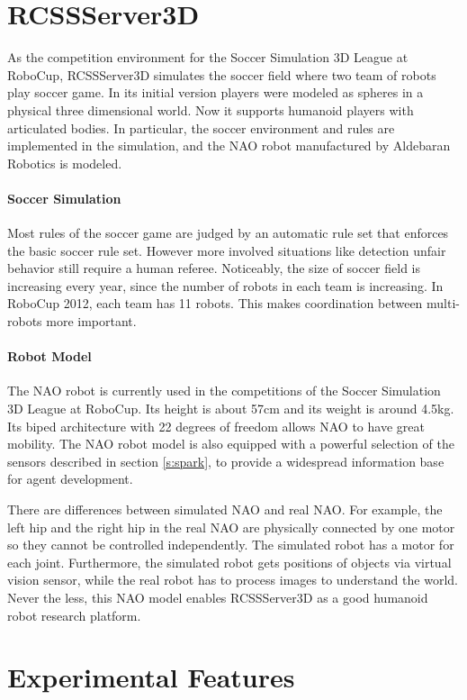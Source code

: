 \documentclass{llncs}
\begin{document}
\section{RCSSServer3D}
\label{s:rcssserver3d}

As the competition environment for the Soccer Simulation 3D League at RoboCup, 
RCSSServer3D simulates the soccer field where two team of robots play soccer game.
In its initial version players were modeled as spheres in a physical three dimensional world. Now it supports humanoid players with articulated bodies. In particular,  the soccer environment and rules are implemented in the simulation, and the NAO robot manufactured by Aldebaran Robotics is modeled.

\paragraph{Soccer Simulation}
Most rules of the soccer game are judged by an automatic rule set that enforces the basic soccer rule set.
However more involved situations like detection unfair behavior still require a human referee.
Noticeably, the size of soccer field is increasing every year, since the number of robots in each team is increasing. In RoboCup 2012, each team has 11 robots.
This makes coordination between multi-robots more important.

\paragraph{Robot Model}
The NAO robot is currently used in the competitions of the Soccer Simulation 3D League at RoboCup. Its height is about 57cm and its weight is around 4.5kg.
Its biped architecture with 22 degrees of freedom allows NAO to have great mobility.
The NAO robot model is also equipped with a powerful selection of the
sensors described in section \ref{s:spark}, to provide a widespread information base for
agent development.

There are differences between simulated NAO and real NAO. For example, the left hip and the right hip in the real NAO are physically connected by one motor so they cannot be controlled independently. The simulated robot has a motor for each joint. Furthermore, the simulated robot gets positions of objects via virtual vision sensor, while the real robot has to process images to understand the world. Never the less, this NAO model enables RCSSServer3D as a good humanoid robot research platform.


\section{Experimental Features}
\label{s:ongoing}
\end{document}

